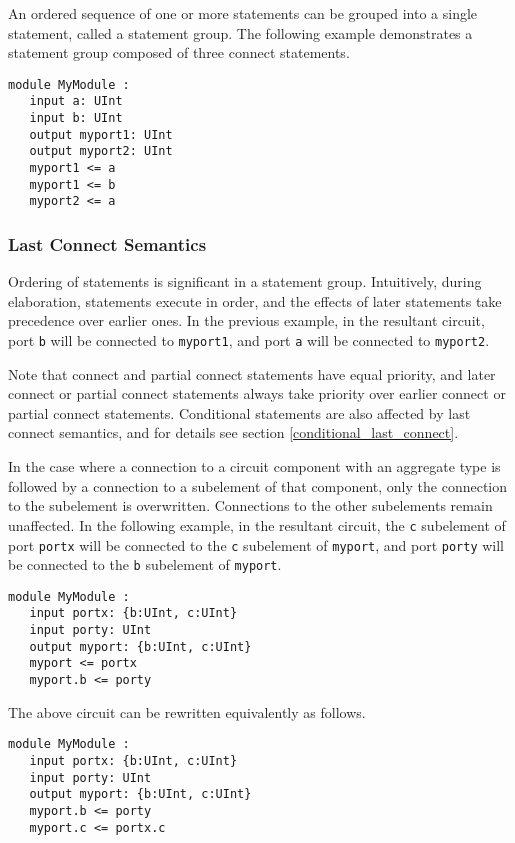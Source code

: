 \documentclass[12pt]{article}
\begin{document}
An ordered sequence of one or more statements can be grouped into a single statement, called a statement group. The following example demonstrates a statement group composed of three connect statements.

\begin{verbatim}
module MyModule :
   input a: UInt
   input b: UInt
   output myport1: UInt
   output myport2: UInt
   myport1 <= a
   myport1 <= b
   myport2 <= a
\end{verbatim}

\subsubsection{Last Connect Semantics}\label{last_connect}
Ordering of statements is significant in a statement group. Intuitively, during elaboration, statements execute in order, and the effects of later statements take precedence over earlier ones. In the previous example, in the resultant circuit, port \verb|b| will be connected to \verb|myport1|, and port \verb|a| will be connected to \verb|myport2|. 

Note that connect and partial connect statements have equal priority, and later connect or partial connect statements always take priority over earlier connect or partial connect statements. Conditional statements are also affected by last connect semantics, and for details see section \ref{conditional_last_connect}.

In the case where a connection to a circuit component with an aggregate type is followed by a connection to a subelement of that component, only the connection to the subelement is overwritten. Connections to the other subelements remain unaffected. In the following example, in the resultant circuit, the \verb|c| subelement of port \verb|portx| will be connected to the \verb|c| subelement of \verb|myport|, and port \verb|porty| will be connected to the \verb|b| subelement of \verb|myport|.
\begin{verbatim}
module MyModule :
   input portx: {b:UInt, c:UInt}
   input porty: UInt
   output myport: {b:UInt, c:UInt}
   myport <= portx
   myport.b <= porty
\end{verbatim}
The above circuit can be rewritten equivalently as follows.
\begin{verbatim}
module MyModule :
   input portx: {b:UInt, c:UInt}
   input porty: UInt
   output myport: {b:UInt, c:UInt}
   myport.b <= porty
   myport.c <= portx.c
\end{verbatim}
\end{document}
